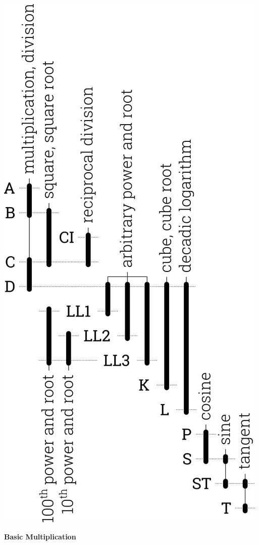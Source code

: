 \begin{multicols*}{3}
{  \centerline{\includegraphics{ops_en}}
  \vspace*{3mm}

  \textbf{Basic Multiplication}

}
\end{multicols*}
